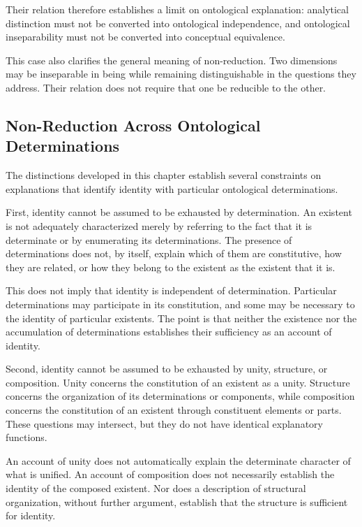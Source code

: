 Their relation therefore establishes a limit on ontological
explanation: analytical distinction must not be converted
into ontological independence, and ontological inseparability
must not be converted into conceptual equivalence.

This case also clarifies the general meaning of non-reduction.
Two dimensions may be inseparable in being while remaining
distinguishable in the questions they address. Their relation
does not require that one be reducible to the other.

\subsection{Non-Reduction Across Ontological Determinations}

The distinctions developed in this chapter establish several
constraints on explanations that identify identity with
particular ontological determinations.

First, identity cannot be assumed to be exhausted by
determination. An existent is not adequately characterized
merely by referring to the fact that it is determinate or by
enumerating its determinations. The presence of determinations
does not, by itself, explain which of them are constitutive,
how they are related, or how they belong to the existent as
the existent that it is.

This does not imply that identity is independent of
determination. Particular determinations may participate in
its constitution, and some may be necessary to the identity
of particular existents. The point is that neither the
existence nor the accumulation of determinations establishes
their sufficiency as an account of identity.

Second, identity cannot be assumed to be exhausted by unity,
structure, or composition. Unity concerns the constitution
of an existent as a unity. Structure concerns the organization
of its determinations or components, while composition
concerns the constitution of an existent through constituent
elements or parts. These questions may intersect, but they
do not have identical explanatory functions.

An account of unity does not automatically explain the
determinate character of what is unified. An account of
composition does not necessarily establish the identity of
the composed existent. Nor does a description of structural
organization, without further argument, establish that the
structure is sufficient for identity.


